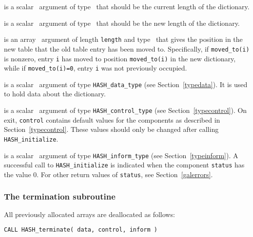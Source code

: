 \documentclass{galahad}
\newcommand{\packagename}{HASH}
\begin{document}
\vspace*{-2mm}
\begin{description}

 is a scalar \intentin\ argument of type \integer\ that
should be the current length of the dictionary.

 is a scalar \intentin\ argument of type \integer\ 
that should be the new length of the dictionary.

 is an array \intentout\ argument of length {\tt length} and 
type \integer\ that gives the position in the new table
that the old table entry has been moved to. Specifically, if 
{\tt moved\_to(i)} is nonzero, entry {\tt i} has moved to position
{\tt moved\_to(i)} in the new dictionary, while if {\tt moved\_to(i)=0},
entry {\tt i} was not previously occupied.

 is a scalar \intentinout\ argument of type
{\tt \packagename\_data\_type}
(see Section~\ref{typedata}). It is used to hold data about the dictionary.

 is a scalar \intentin\ argument of type
{\tt \packagename\_control\_type}
(see Section~\ref{typecontrol}).
On exit, {\tt control} contains default values for the components as
described in Section~\ref{typecontrol}.
These values should only be changed after calling
{\tt \packagename\_initialize}.

 is a scalar \intentinout\ argument of type
{\tt \packagename\_inform\_type}
(see Section~\ref{typeinform}). A successful call to
{\tt \packagename\_initialize}
is indicated when the  component {\tt status} has the value 0.
For other return values of {\tt status}, see Section~\ref{galerrors}.

\end{description}


\subsubsection{The  termination subroutine}
All previously allocated arrays are deallocated as follows:
\vspace*{1mm}

\hspace{8mm}
{\tt CALL \packagename\_terminate( data, control, inform )}
\end{document}
